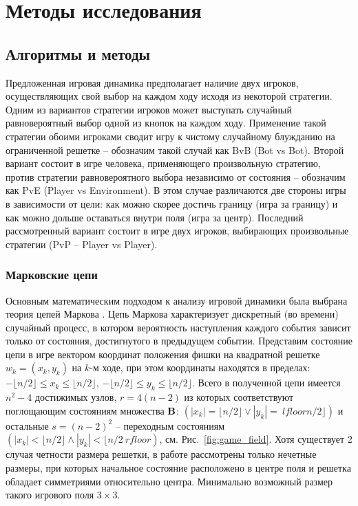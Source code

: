 \chapter{Методы исследования}\label{ch:ch2}

\section{Алгоритмы и методы}\label{sec:ch1/sec3}

Предложенная игровая динамика предполагает наличие двух игроков, осуществляющих свой выбор на каждом ходу исходя из некоторой стратегии.
Одним из вариантов стратегии игроков может выступать случайный равновероятный выбор одной из кнопок на каждом ходу.
Применение такой стратегии обоими игроками сводит игру к чистому случайному блужданию на ограниченной решетке -- обозначим такой случай как BvB (Bot vs Bot).
Второй вариант состоит в игре человека, применяющего произвольную стратегию, против стратегии равновероятного выбора независимо от состояния -- обозначим как PvE (Player vs Environment).
В этом случае различаются две стороны игры в зависимости от цели: как можно скорее достичь границу (игра за границу) и
как можно дольше оставаться внутри поля (игра за центр). Последний рассмотренный вариант состоит в игре двух игроков, 
выбирающих произвольные стратегии (PvP -- Player vs Player).

\subsection{Марковские цепи}\label{subsec:ch1/sec3/sub1}

Основным математическим подходом к анализу игровой динамики была выбрана теория цепей Маркова \cite{markov_chain}.
Цепь Маркова характеризует дискретный (во времени) случайный процесс, в котором вероятность наступления каждого события 
зависит только от состояния, достигнутого в предыдущем событии. Представим состояние цепи в игре вектором координат 
положения фишки на квадратной решетке $w_k = (x_k, y_k)$ на $k$-м ходе, при этом координаты находятся в пределах: 
$-\lfloor n/2 \rfloor \leq x_k \leq \lfloor n/2 \rfloor$, $-\lfloor n/2 \rfloor \leq y_k \leq \lfloor n/2 \rfloor$. 
Всего в полученной цепи имеется $n^2-4$ достижимых узлов, $r=4(n-2)$ из которых соответствуют поглощающим состояниям множества ${\bf B}$: 
$(|x_k|=\lfloor n/2 \rfloor \lor |y_k|=\ lfloor n/2 \rfloor)$ и остальные $s=(n-2)^2$ -- переходным состояниям
$(|x_k|<\lfloor n/2 \rfloor \land |y_k|<\lfloor n/2 \ rfloor)$, см. Рис.~\cref{fig:game_field}. 
Хотя существует 2 случая четности размера решетки, в работе рассмотрены только нечетные размеры, при которых 
начальное состояние расположено в центре поля и решетка обладает симметриями относительно центра. 
Минимально возможный размер такого игрового поля $3\times 3$. 


